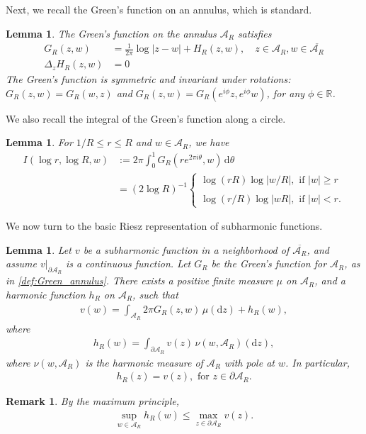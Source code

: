 \documentclass[11pt]{amsart}
\newtheorem{lemma}[theorem]{Lemma}
\newtheorem{remark}[theorem]{Remark}
\newcommand{\R}{\mathbb R}
\begin{document}
Next, we recall the Green's function on an annulus, which is standard. 
\begin{lemma}\cite[Lemma 3.1]{HS2}\label{lem:Green_AR}
The Green's function on the annulus $\mathcal{A}_R$ satisfies
\begin{align} 
G_R(z,w) &= \frac{1}{2\pi}\log |z-w| + H_R(z,w), \quad z\in \mathcal{A}_R, w\in \overline{\mathcal{A}_R} \label{def:Green_annulus} \\
\Delta_z H_R (z,w) &= 0 \nonumber
\end{align}
The Green's function is symmetric and invariant under rotations: $G_R(z,w)=G_R(w,z)$ and $G_R(z,w)=G_R(e^{i\phi} z,e^{i\phi} w)$, for any $\phi\in \R$.
\end{lemma}
We also recall the integral of the Green's function along a circle.
\begin{lemma}\cite[Lemma 3.2]{HS2}\label{lem:int_Green}
For $1/R\leq r\leq R$ and $w\in \mathcal{A}_R$, we have
\begin{align}\label{eq:int_Green}
I(\log r, \log R, w) &:=2\pi \int_0^{1}  G_R (re^{ 2\pi i\theta}, w)\, \mathrm{d}\theta \\
& =(2\log R)^{-1}
\begin{cases}
 \log (rR) \log|w/R|, \text{ if } |w|\geq r\\
\\
\log( r/ R) \log |w R|, \text{ if } |w|<r.
\end{cases}
\end{align}
\end{lemma}

We now turn to the basic Riesz representation of subharmonic functions. 
\begin{lemma}\cite[Lemma 3.3]{HS2}\label{lem:Riesz}
Let $v$ be a subharmonic function in a neighborhood of $\overline{\mathcal{A}_R}$, and assume $v|_{\partial \mathcal{A}_R}$ is a continuous function.
Let $G_R$ be the Green's function for $\mathcal{A}_R$, as  in \eqref{def:Green_annulus}.
There exists a positive finite measure $\mu$ on $\mathcal{A}_R$, and a harmonic function $h_R$ on $\mathcal{A}_R$, such that
\begin{align*}
v(w)=\int_{\mathcal{A}_R} 2\pi G_R(z,w)\, \mu(\mathrm{d}z)+h_R(w),
\end{align*}
where 
\begin{align}\label{eq:Poisson}
h_R(w)=\int_{\partial \mathcal{A}_R} v(z)\,\nu(w,\mathcal{A}_R)( \mathrm{d}z),
\end{align}
where $\nu(w,\mathcal{A}_R)$ is the harmonic measure of $\mathcal{A}_R$ with pole at $w$.
In particular, 
\begin{align}\label{eq:h=v}
h_R(z)=v(z), \text{ for } z\in \partial \mathcal{A}_R.
\end{align}
\end{lemma}
\begin{remark}
By the maximum principle, 
\begin{align}\label{eq:max_h}
\sup_{w\in \mathcal{A}_R} h_R(w)\leq \max_{z\in \partial \mathcal{A}_R} v(z).
\end{align}
\end{remark}
\end{document}
